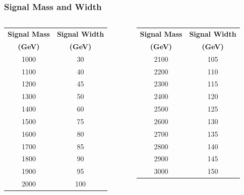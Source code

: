 \documentclass{beamer}
\begin{document}
\begin{frame}
\frametitle{Signal Mass and Width}
\begin{columns}
\begin{column}{0.5\textwidth}
\begin{table}
\begin{tabular}{cc}
\textbf{Signal Mass} & \textbf{Signal Width} \\
\textbf{(GeV)} & \textbf{(GeV)} \\
1000 & 30 \\
1100 & 40 \\
1200 & 45 \\
1300 & 50 \\
1400 & 60 \\
1500 & 75 \\
1600 & 80 \\
1700 & 85 \\
1800 & 90 \\
1900 & 95 \\
2000 & 100 \\
\end{tabular}
\end{table}
\end{column}
\begin{column}{0.5\textwidth}
\begin{table}
\begin{tabular}{cc}
\textbf{Signal Mass} & \textbf{Signal Width} \\
\textbf{(GeV)} & \textbf{(GeV)} \\
2100 & 105 \\
2200 & 110 \\
2300 & 115 \\
2400 & 120 \\
2500 & 125 \\
2600 & 130 \\
2700 & 135 \\
2800 & 140 \\
2900 & 145 \\
3000 & 150 \\
\end{tabular}
\end{table}
\end{column}
\end{columns}
\end{frame}
\end{document}
